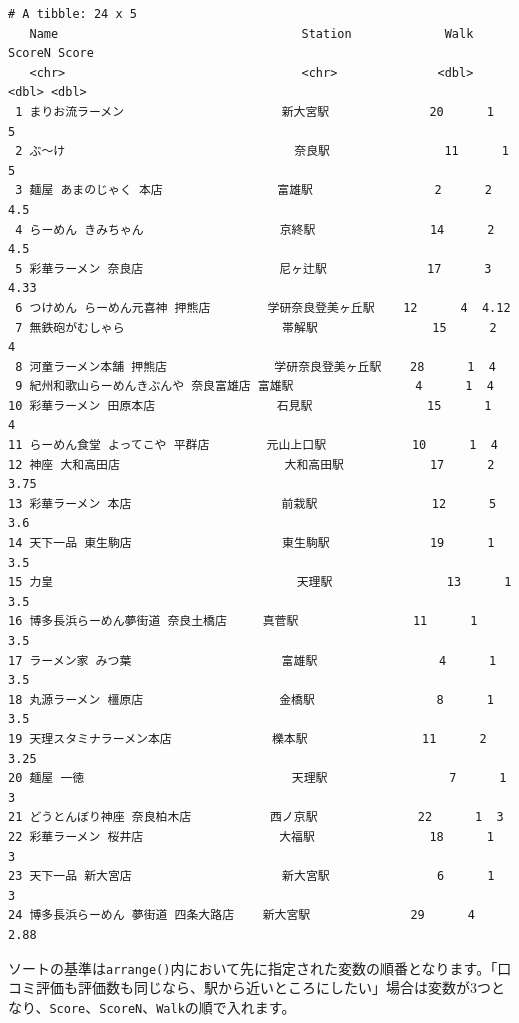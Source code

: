 \documentclass[
  a4paper,
  pandoc,
  ja=standard,
  jafont=haranoaji]{bxjsbook}
\begin{document}
\begin{verbatim}
# A tibble: 24 x 5
   Name                                  Station             Walk ScoreN Score
   <chr>                                 <chr>              <dbl>  <dbl> <dbl>
 1 まりお流ラーメン                      新大宮駅              20      1  5   
 2 ぶ～け                                奈良駅                11      1  5   
 3 麺屋 あまのじゃく 本店                富雄駅                 2      2  4.5 
 4 らーめん きみちゃん                   京終駅                14      2  4.5 
 5 彩華ラーメン 奈良店                   尼ヶ辻駅              17      3  4.33
 6 つけめん らーめん元喜神 押熊店        学研奈良登美ヶ丘駅    12      4  4.12
 7 無鉄砲がむしゃら                      帯解駅                15      2  4   
 8 河童ラーメン本舗 押熊店               学研奈良登美ヶ丘駅    28      1  4   
 9 紀州和歌山らーめんきぶんや 奈良富雄店 富雄駅                 4      1  4   
10 彩華ラーメン 田原本店                 石見駅                15      1  4   
11 らーめん食堂 よってこや 平群店        元山上口駅            10      1  4   
12 神座 大和高田店                       大和高田駅            17      2  3.75
13 彩華ラーメン 本店                     前栽駅                12      5  3.6 
14 天下一品 東生駒店                     東生駒駅              19      1  3.5 
15 力皇                                  天理駅                13      1  3.5 
16 博多長浜らーめん夢街道 奈良土橋店     真菅駅                11      1  3.5 
17 ラーメン家 みつ葉                     富雄駅                 4      1  3.5 
18 丸源ラーメン 橿原店                   金橋駅                 8      1  3.5 
19 天理スタミナラーメン本店              櫟本駅                11      2  3.25
20 麺屋 一徳                             天理駅                 7      1  3   
21 どうとんぼり神座 奈良柏木店           西ノ京駅              22      1  3   
22 彩華ラーメン 桜井店                   大福駅                18      1  3   
23 天下一品 新大宮店                     新大宮駅               6      1  3   
24 博多長浜らーめん 夢街道 四条大路店    新大宮駅              29      4  2.88
\end{verbatim}

ソートの基準は\texttt{arrange()}内において先に指定された変数の順番となります。「口コミ評価も評価数も同じなら、駅から近いところにしたい」場合は変数が3つとなり、\texttt{Score}、\texttt{ScoreN}、\texttt{Walk}の順で入れます。
\end{document}
